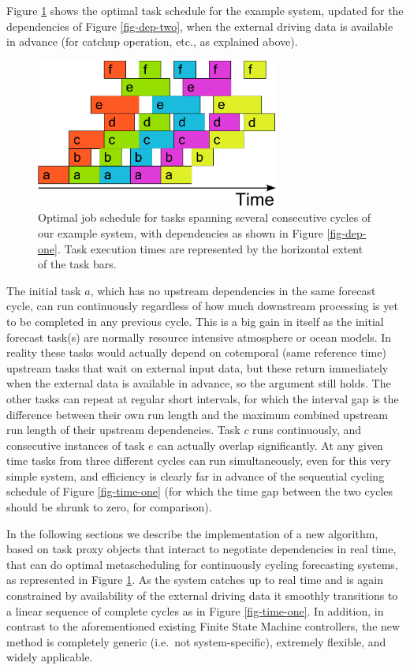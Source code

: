 \documentclass[11pt,a4paper]{article}
\begin{document}
Figure \ref{fig-time-two} shows the optimal task schedule for the
example system, updated for the dependencies of Figure
\ref{fig-dep-two}, when the external driving data is available in
advance (for catchup operation, etc., as explained above).
\begin{figure} \begin{center} \includegraphics[width=8cm]{timeline-two}
\end{center} \caption{\small Optimal job schedule for tasks spanning
several consecutive cycles of our example system, with dependencies as
shown in Figure \ref{fig-dep-one}. Task execution times are represented
by the horizontal extent of the task bars.} \label{fig-time-two}
\end{figure} The initial task $a$, which has no upstream dependencies in
the same forecast cycle, can run continuously regardless of how much
downstream processing is yet to be completed in any previous cycle.
This is a big gain in itself as the initial forecast task(s) are
normally resource intensive atmosphere or ocean models. In reality these
tasks would actually depend on cotemporal (same reference time) upstream
tasks that wait on external input data, but these return immediately
when the external data is available in advance, so the argument still
holds. The other tasks can repeat at regular short intervals, for which
the interval gap is the difference between their own run length and the
maximum combined upstream run length of their upstream dependencies.
Task $c$ runs continuously, and consecutive instances of task $e$ can
actually overlap significantly. At any given time tasks from three
different cycles can run simultaneously, even for this very simple
system, and efficiency is clearly far in advance of the sequential
cycling schedule of Figure \ref{fig-time-one} (for which the time gap
between the two cycles should be shrunk to zero, for comparison). 

In the following sections we describe the implementation of a new
algorithm, based on task proxy objects that interact to negotiate
dependencies in real time, that can do optimal metascheduling for
continuously cycling forecasting systems, as represented in Figure
\ref{fig-time-two}. As the system catches up to real time and is again
constrained by availability of the external driving data it smoothly
transitions to a linear sequence of complete cycles as in Figure
\ref{fig-time-one}.  In addition, in contrast to the aforementioned
existing Finite State Machine controllers, the new method is completely
generic (i.e.\ not system-specific), extremely flexible, and widely
applicable.  
\end{document}
